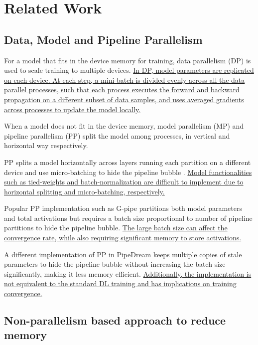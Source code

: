 \section{Related Work}
\label{sec:related-work}
\subsection{Data, Model and Pipeline Parallelism}
For a model that fits in the device memory for training, data parallelism (DP) is used to scale training to multiple devices. \uline{In DP, model parameters are replicated on each device. At each step, a mini-batch is divided evenly across all the data parallel processes, such that each process executes the forward and backward propagation on a different subset of data samples, and uses averaged gradients across processes to update the model locally.}

When a model does not fit in the device memory, model parallelism (MP) \cite{DBLP:journals/corr/mesh-tensor, megatronlm} and pipeline parallelism (PP) \cite{GPipe, DBLP:journals/corr/pipedream} split the model among processes, in vertical and horizontal way respectively.

PP splits a model horizontally across layers running each partition on a different device and use micro-batching to hide the pipeline bubble \cite{GPipe,DBLP:journals/corr/pipedream}.
\uline{Model functionalities such as tied-weights and batch-normalization are difficult to implement due to horizontal splitting and micro-batching, respectively.}

Popular PP implementation such as G-pipe \cite{GPipe} partitions both model parameters and total activations but requires a batch size proportional to number of pipeline partitions to hide the pipeline bubble.
\uline{The large batch size can affect the convergence rate, while also requiring significant memory to store activations.}

A different implementation of PP in PipeDream \cite{narayanan2019pipedream} keeps multiple copies of stale parameters to hide the pipeline bubble without increasing the batch size significantly, making it less memory efficient.
\uline{Additionally, the implementation is not equivalent to the standard DL training and has implications on training convergence.}

\subsection{Non-parallelism based approach to reduce memory}

